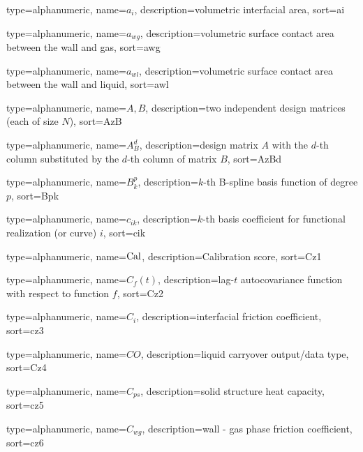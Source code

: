 
{
  type=alphanumeric,
	name={\ensuremath{a_i}},
	description={volumetric interfacial area},
	sort={ai}
}

{
  type=alphanumeric,
	name={\ensuremath{a_{wg}}},
	description={volumetric surface contact area between the wall and gas},
	sort={awg}
}

{
  type=alphanumeric,
	name={\ensuremath{a_{wl}}},
	description={volumetric surface contact area between the wall and liquid},
	sort={awl}
}

{
  type=alphanumeric,
	name={\ensuremath{A, B}},
	description={two independent design matrices (each of size $N$)},
	sort={AzB}
}

{
  type=alphanumeric,
	name={\ensuremath{A^d_B}},
	description={design matrix $A$ with the $d$-th column substituted by the $d$-th column of matrix $B$},
	sort={AzBd}
}

{
  type=alphanumeric,
	name={\ensuremath{B^p_k}},
	description={$k$-th B-spline basis function of degree $p$},
	sort={Bpk}
}

{
  type=alphanumeric,
	name={\ensuremath{c_{ik}}},
	description={$k$-th basis coefficient for functional realization (or curve) $i$},
	sort={cik}
}

{
  type=alphanumeric,
	name={\ensuremath{\textnormal{Cal}}},
	description={Calibration score},
	sort={Cz1}
}

{
  type=alphanumeric,
	name={\ensuremath{C_f (t)}},
	description={lag-$t$ autocovariance function with respect to function $f$},
	sort={Cz2}
}

{
  type=alphanumeric,
	name={\ensuremath{C_i}},
	description={interfacial friction coefficient},
	sort={cz3}
}

{
  type=alphanumeric,
	name={\ensuremath{CO}},
	description={liquid carryover output/data type},
	sort={Cz4}
}

{
  type=alphanumeric,
	name={\ensuremath{C_{ps}}},
	description={solid structure heat capacity},
	sort={cz5}
}

{
  type=alphanumeric,
	name={\ensuremath{C_{wg}}},
	description={wall - gas phase friction coefficient},
	sort={cz6}
}

